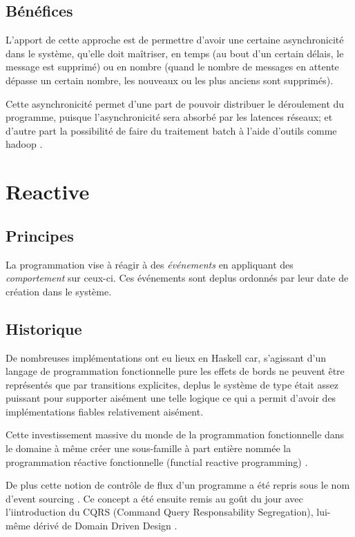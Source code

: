 \documentclass{article}
\begin{document}
\subsection{Bénéfices}\label{bénéfices}

L'apport de cette approche est de permettre d'avoir une certaine
asynchronicité dans le système, qu'elle doit maîtriser, en temps (au
bout d'un certain délais, le message est supprimé) ou en nombre (quand
le nombre de messages en attente dépasse un certain nombre, les nouveaux
ou les plus anciens sont supprimés).

Cette asynchronicité permet d'une part de pouvoir distribuer le
déroulement du programme, puisque l'asynchronicité sera absorbé par les
latences réseaux; et d'autre part la possibilité de faire du traitement
batch à l'aide d'outils comme hadoop \cite{hadoop}.

\section{Reactive}\label{reactive}

\subsection{Principes}\label{principes-1}

La programmation vise à réagir à des \emph{événements} en appliquant des
\emph{comportement} sur ceux-ci. Ces événements sont deplus ordonnés par
leur date de création dans le système.

\subsection{Historique}\label{historique}

De nombreuses implémentations ont eu lieux en Haskell \cite{haskell} car,
s'agissant d'un langage de programmation fonctionnelle pure les effets
de bords ne peuvent être représentés que par transitions explicites,
deplus le système de type était assez puissant pour supporter aisément
une telle logique ce qui a permit d'avoir des implémentations fiables
relativement aisément.

Cette investissement massive du monde de la programmation fonctionnelle
dans le domaine à même créer une sous-famille à part entière nommée la
programmation réactive fonctionnelle (functial reactive programming)
\cite{frp}.

De plus cette notion de contrôle de flux d'un programme a été repris
sous le nom d'event sourcing \cite{eventsourcing}. Ce concept a été ensuite remis au
goût du jour avec l'iintroduction du CQRS \cite{cqrs} (Command Query
Responsability Segregation), lui-même dérivé de Domain Driven Design
\cite{ddd}.
\end{document}
